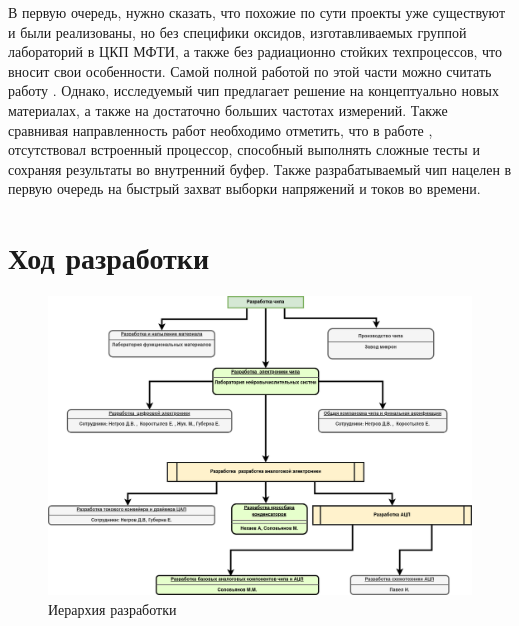 \documentclass[a4paper,12pt]{article} %
\begin{document}
В первую очередь, нужно сказать, что похожие по сути проекты уже существуют и были реализованы, но без специфики оксидов, изготавливаемых группой лабораторий в ЦКП МФТИ, а также без радиационно стойких техпроцессов, что вносит свои особенности. Самой полной работой по этой части можно считать работу \cite{FRAM}. Однако, исследуемый чип предлагает решение на концептуально новых материалах, а также на достаточно больших частотах измерений. Также сравнивая направленность работ необходимо отметить, что в работе \cite{FRAM}, отсутствовал встроенный процессор, способный выполнять сложные тесты и сохраняя результаты во внутренний буфер. Также разрабатываемый чип нацелен в первую очередь на быстрый захват выборки напряжений и токов во времени.

\section{Ход разработки}

\begin{figure}[H]
    \includegraphics[width=\textwidth]{struct.png}
    \caption{Иерархия разработки}
    \label{pic:struct}
\end{figure}
\end{document}
